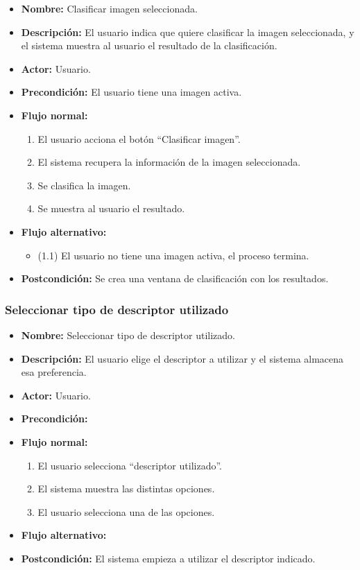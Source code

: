 \begin{itemize}
\item \textbf{Nombre: }Clasificar imagen seleccionada.
\item \textbf{Descripción: } El usuario indica que quiere clasificar la imagen seleccionada, y el sistema muestra al usuario el resultado de la clasificación.
\item \textbf{Actor: }Usuario.
\item \textbf{Precondición: }El usuario tiene una imagen activa.
\item \textbf{Flujo normal: }
\begin{enumerate}
\item El usuario acciona el botón ``Clasificar imagen''.
\item El sistema recupera la información de la imagen seleccionada.
\item Se clasifica la imagen.
\item Se muestra al usuario el resultado.
\end{enumerate}
\item \textbf{Flujo alternativo:}
\begin{itemize}
\item (1.1) El usuario no tiene una imagen activa, el proceso termina.
\end{itemize}
\item \textbf{Postcondición: }Se crea una ventana de clasificación con los resultados.
\end{itemize}

\subsubsection{Seleccionar tipo de descriptor utilizado}

\begin{itemize}
\item \textbf{Nombre: }Seleccionar tipo de descriptor utilizado.
\item \textbf{Descripción: }El usuario elige el descriptor a utilizar y el sistema almacena esa preferencia.
\item \textbf{Actor: }Usuario.
\item \textbf{Precondición: }
\item \textbf{Flujo normal: }
\begin{enumerate}
\item El usuario selecciona ``descriptor utilizado''.
\item El sistema muestra las distintas opciones.
\item El usuario selecciona una de las opciones.
\end{enumerate}
\item \textbf{Flujo alternativo:}
\item \textbf{Postcondición: }El sistema empieza a utilizar el descriptor indicado.
\end{itemize}

